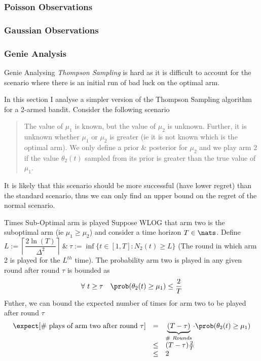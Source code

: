 \documentclass[11pt,a4paper]{article}
\begin{document}
\subsubsection*{Poisson Observations}

\subsubsection*{Gaussian Observations}

\subsubsection{Genie Analysis}

\begin{remark}{Genie}
  Analysing \textit{Thompson Sampling} is hard as it is difficult to account for the scenario where there is an initial run of bad luck on the optimal arm.
  \par In this section I analyse a simpler version of the Thompson Sampling algorithm for a 2-armed bandit. Consider the following scenario
  \begin{quote}
    The value of $\mu_1$ is known, but the value of $\mu_2$ is unknown. Further, it is unknown whether $\mu_1$ or $\mu_2$ is greater (ie it is not known which is the optimal arm). We only define a prior \& posterior for $\mu_2$ and we play arm 2 if the value $\theta_2(t)$ sampled from its prior is greater than the true value of $\mu_1$.
  \end{quote}
  \par It is likely that this scenario should be more successful (have lower regret)%
   than the standard scenario, thus we can only find an upper bound on the regret of the normal scenario.
\end{remark}

\begin{theorem}{Times Sub-Optimal arm is played}
  Suppose WLOG that arm two is the suboptimal arm (ie $\mu_1\geq\mu_2$) and consider a time horizon $T\in\nats$. Define $L:=\left\lceil\dfrac{2\ln(T)}{\Delta^2}\right\rceil\ \&\ \tau:=\inf\{t\in[1,T]:N_2(t)\geq L\}$ (The round in which arm 2 is played for the $L^{th}$ time). The probability arm two is played in any given round after round $\tau$ is bounded as
  \[ \forall\ t\geq\tau\quad\prob(\theta_2(t)\geq\mu_1)\leq\frac2T \]
  Futher, we can bound the expected number of times for arm two to be played after round $\tau$
  \[\begin{array}{rcl}
    \expect[\#\text{ plays of arm two after round }\tau]&=&\underbrace{(T-\tau)}_{\#\ Rounds}\cdot\prob(\theta_2(t)\geq\mu_1)\\
    &\leq&(T-\tau)\frac{2}T\\
    &\leq&2
  \end{array}\]
\end{theorem}
\end{document}
